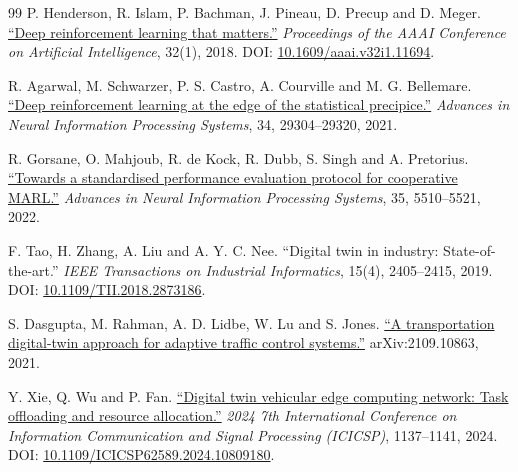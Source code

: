 \documentclass[12pt,a4paper]{article}
\begin{document}
\begin{thebibliography}{99}
 P. Henderson, R. Islam, P. Bachman, J. Pineau, D. Precup and D. Meger. \href{\detokenize{https://ojs.aaai.org/index.php/AAAI/article/view/11694}}{``Deep reinforcement learning that matters.''} \emph{Proceedings of the AAAI Conference on Artificial Intelligence}, 32(1), 2018. DOI: \href{\detokenize{https://doi.org/10.1609/aaai.v32i1.11694}}{10.1609/aaai.v32i1.11694}.

 R. Agarwal, M. Schwarzer, P. S. Castro, A. Courville and M. G. Bellemare. \href{\detokenize{https://proceedings.neurips.cc/paper/2021/hash/f514cec81cb148559cf475e7426eed5e-Abstract.html}}{``Deep reinforcement learning at the edge of the statistical precipice.''} \emph{Advances in Neural Information Processing Systems}, 34, 29304--29320, 2021.

 R. Gorsane, O. Mahjoub, R. de Kock, R. Dubb, S. Singh and A. Pretorius. \href{\detokenize{https://arxiv.org/abs/2209.10485}}{``Towards a standardised performance evaluation protocol for cooperative MARL.''} \emph{Advances in Neural Information Processing Systems}, 35, 5510--5521, 2022.

 F. Tao, H. Zhang, A. Liu and A. Y. C. Nee. ``Digital twin in industry: State-of-the-art.'' \emph{IEEE Transactions on Industrial Informatics}, 15(4), 2405--2415, 2019. DOI: \href{\detokenize{https://doi.org/10.1109/TII.2018.2873186}}{10.1109/TII.2018.2873186}.

 S. Dasgupta, M. Rahman, A. D. Lidbe, W. Lu and S. Jones. \href{\detokenize{https://arxiv.org/abs/2109.10863}}{``A transportation digital-twin approach for adaptive traffic control systems.''} arXiv:2109.10863, 2021.

 Y. Xie, Q. Wu and P. Fan. \href{\detokenize{https://arxiv.org/abs/2407.11310}}{``Digital twin vehicular edge computing network: Task offloading and resource allocation.''} \emph{2024 7th International Conference on Information Communication and Signal Processing (ICICSP)}, 1137--1141, 2024. DOI: \href{\detokenize{https://doi.org/10.1109/ICICSP62589.2024.10809180}}{10.1109/ICICSP62589.2024.10809180}.


\end{thebibliography}
\end{document}
